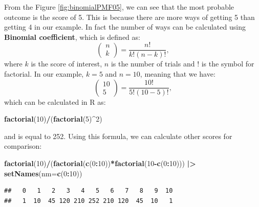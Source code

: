 \documentclass[
]{book}
\newenvironment{Shaded}{\begin{snugshade}}{\end{snugshade}}
\newcommand{\DataTypeTok}[1]{\textcolor[rgb]{0.13,0.29,0.53}{#1}}
\newcommand{\DecValTok}[1]{\textcolor[rgb]{0.00,0.00,0.81}{#1}}
\newcommand{\ErrorTok}[1]{\textcolor[rgb]{0.64,0.00,0.00}{\textbf{#1}}}
\newcommand{\KeywordTok}[1]{\textcolor[rgb]{0.13,0.29,0.53}{\textbf{#1}}}
\newcommand{\NormalTok}[1]{#1}
\newcommand{\OperatorTok}[1]{\textcolor[rgb]{0.81,0.36,0.00}{\textbf{#1}}}
\newcommand{\StringTok}[1]{\textcolor[rgb]{0.31,0.60,0.02}{#1}}
\theoremstyle{definition}
\theoremstyle{definition}
\theoremstyle{definition}
\theoremstyle{definition}
\theoremstyle{remark}
\begin{document}
From the Figure \ref{fig:binomialPMF05}, we can see that the most probable outcome is the score of 5. This is because there are more ways of getting 5 than getting 4 in our example. In fact the number of ways can be calculated using \textbf{Binomial coefficient}, which is defined as:
\begin{equation}
    \begin{pmatrix} n \\ k \end{pmatrix} = \frac{n!}{k!(n-k)!},
    \label{eq:BinomialCoefficient}
\end{equation}
where \(k\) is the score of interest, \(n\) is the number of trials and \(!\) is the symbol for factorial. In our example, \(k=5\) and \(n=10\), meaning that we have:
\begin{equation*}
    \begin{pmatrix} 10 \\ 5 \end{pmatrix} = \frac{10!}{5!(10-5)!} ,
\end{equation*}
which can be calculated in R as:

\begin{Shaded}
\begin{Highlighting}[]
\KeywordTok{factorial}\NormalTok{(}\DecValTok{10}\NormalTok{)}\OperatorTok{/}\NormalTok{(}\KeywordTok{factorial}\NormalTok{(}\DecValTok{5}\NormalTok{)}\OperatorTok{\^{}}\DecValTok{2}\NormalTok{)}
\end{Highlighting}
\end{Shaded}

and is equal to 252. Using this formula, we can calculate other scores for comparison:

\begin{Shaded}
\begin{Highlighting}[]
\KeywordTok{factorial}\NormalTok{(}\DecValTok{10}\NormalTok{)}\OperatorTok{/}\NormalTok{(}\KeywordTok{factorial}\NormalTok{(}\KeywordTok{c}\NormalTok{(}\DecValTok{0}\OperatorTok{:}\DecValTok{10}\NormalTok{))}\OperatorTok{*}\KeywordTok{factorial}\NormalTok{(}\DecValTok{10}\OperatorTok{{-}}\KeywordTok{c}\NormalTok{(}\DecValTok{0}\OperatorTok{:}\DecValTok{10}\NormalTok{))) }\OperatorTok{|}\ErrorTok{\textgreater{}}
\StringTok{    }\KeywordTok{setNames}\NormalTok{(}\DataTypeTok{nm=}\KeywordTok{c}\NormalTok{(}\DecValTok{0}\OperatorTok{:}\DecValTok{10}\NormalTok{))}
\end{Highlighting}
\end{Shaded}

\begin{verbatim}
##   0   1   2   3   4   5   6   7   8   9  10 
##   1  10  45 120 210 252 210 120  45  10   1
\end{verbatim}
\end{document}

